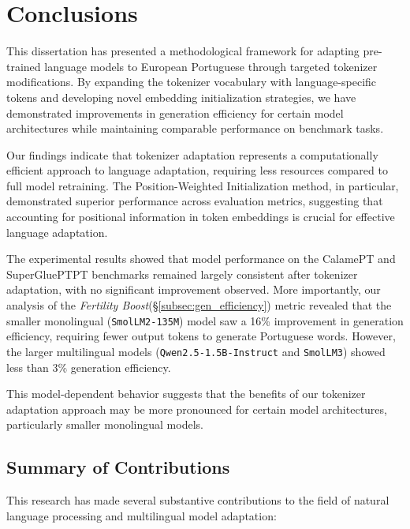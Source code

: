 
\chapter{Conclusions}


\label{chap:conclusions}
This dissertation has presented a methodological framework for adapting pre-trained language models to European Portuguese through targeted tokenizer modifications. By expanding the tokenizer vocabulary with language-specific tokens and developing novel embedding initialization strategies, we have demonstrated improvements in generation efficiency for certain model architectures while maintaining comparable performance on benchmark tasks.

Our findings indicate that tokenizer adaptation represents a computationally efficient approach to language adaptation, requiring less resources compared to full model retraining. The Position-Weighted Initialization method, in particular, demonstrated superior performance across evaluation metrics, suggesting that accounting for positional information in token embeddings is crucial for effective language adaptation.

The experimental results showed that model performance on the CalamePT and SuperGluePTPT benchmarks remained largely consistent after tokenizer adaptation, with no significant improvement observed. More importantly, our analysis of the \textit{Fertility Boost}(\S \ref{subsec:gen_efficiency}) metric revealed that the smaller monolingual (\texttt{SmolLM2-135M}) model saw a 16\% improvement in generation efficiency, requiring fewer output tokens to generate Portuguese words. However, the larger multilingual models (\texttt{Qwen2.5-1.5B-Instruct} and \texttt{SmolLM3}) showed less than 3\% generation efficiency.

This model-dependent behavior suggests that the benefits of our tokenizer adaptation approach may be more pronounced for certain model architectures, particularly smaller monolingual models.

\section{Summary of Contributions}
This research has made several substantive contributions to the field of natural language processing and multilingual model adaptation:

